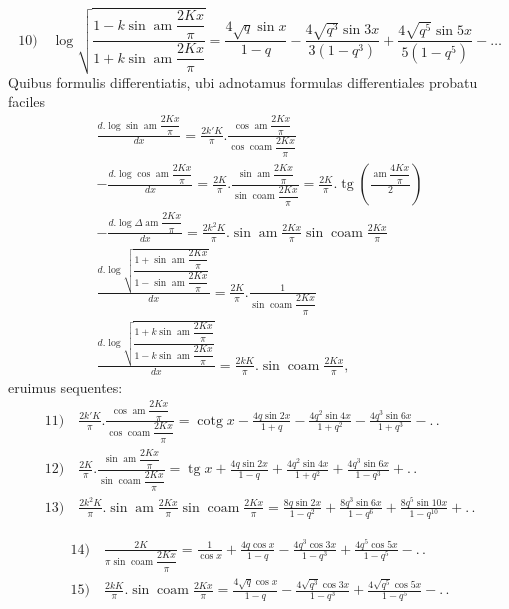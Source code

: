 \documentclass{article}
\begin{document}
\[
\text{10)}\quad\log\sqrt{\frac{1-k\sin\operatorname{am}\dfrac{2Kx}{\pi}}{1+k\sin\operatorname{am}\dfrac{2Kx}{\pi}}}=\frac{4\sqrt{q}\sin x}{1-q}-\frac{4\sqrt{q^{3}}\sin3x}{3(1-q^{3})}+\frac{4\sqrt{q^{5}}\sin5x}{5(1-q^{5})}-\ldots
\]
Quibus formulis differentiatis, ubi adnotamus formulas differentiales probatu faciles
\[
\begin{gathered}
\frac{d.\log\sin\operatorname{am}\dfrac{2Kx}{\pi}}{dx}=\frac{2k'K}{\pi}.\frac{\cos\operatorname{am}\dfrac{2Kx}{\pi}}{\cos\operatorname{coam}\dfrac{2Kx}{\pi}}\\[2ex]
-\frac{d.\log\cos\operatorname{am}\dfrac{2Kx}{\pi}}{dx}=\frac{2K}{\pi}.\frac{\sin\operatorname{am}\dfrac{2Kx}{\pi}}{\sin\operatorname{coam}\dfrac{2Kx}{\pi}}=\frac{2K}{\pi}.\operatorname{tg}\left(\frac{\operatorname{am}\dfrac{4Kx}{\pi}}{2}\right)\\[2ex]
-\frac{d.\log\Delta\operatorname{am}\dfrac{2Kx}{\pi}}{dx}=\frac{2k^{2}K}{\pi}.\sin\operatorname{am}\frac{2Kx}{\pi}\sin\operatorname{coam}\frac{2Kx}{\pi}\\[2ex]
\frac{d.\log\sqrt{\dfrac{1+\sin\operatorname{am}\dfrac{2Kx}{\pi}}{1-\sin\operatorname{am}\dfrac{2Kx}{\pi}}}}{dx}=\frac{2K}{\pi}.\frac{1}{\sin\operatorname{coam}\dfrac{2Kx}{\pi}}\\[2ex]
\frac{d.\log\sqrt{\dfrac{1+k\sin\operatorname{am}\dfrac{2Kx}{\pi}}{1-k\sin\operatorname{am}\dfrac{2Kx}{\pi}}}}{dx}=\frac{2kK}{\pi}.\sin\operatorname{coam}\frac{2Kx}{\pi},
\end{gathered}
\]
eruimus sequentes:
\[
\begin{gathered}
\text{11)}\quad\frac{2k'K}{\pi}.\frac{\cos\operatorname{am}\dfrac{2Kx}{\pi}}{\cos\operatorname{coam}\dfrac{2Kx}{\pi}}=\operatorname{cotg}x-\frac{4q\sin2x}{1+q}-\frac{4q^{2}\sin4x}{1+q^{2}}-\frac{4q^{3}\sin6x}{1+q^{3}}-.\,.\\[2ex]
\text{12)}\quad\frac{2K}{\pi}.\frac{\sin\operatorname{am}\dfrac{2Kx}{\pi}}{\sin\operatorname{coam}\dfrac{2Kx}{\pi}}=\operatorname{tg}x+\frac{4q\sin2x}{1-q}+\frac{4q^{2}\sin4x}{1+q^{2}}+\frac{4q^{3}\sin6x}{1-q^{3}}+.\,.\\[2ex]
\text{13)}\quad\frac{2k^{2}K}{\pi}.\sin\operatorname{am}\frac{2Kx}{\pi}\sin\operatorname{coam}\frac{2Kx}{\pi}=\frac{8q\sin2x}{1-q^{2}}+\frac{8q^{3}\sin6x}{1-q^{6}}+\frac{8q^{5}\sin10x}{1-q^{10}}+.\,.
\end{gathered}
\]

\[
\begin{gathered}
\text{14)}\quad\frac{2K}{\pi\sin\operatorname{coam}\dfrac{2Kx}{\pi}}=\frac{1}{\cos x}+\frac{4q\cos x}{1-q}-\frac{4q^{3}\cos3x}{1-q^{3}}+\frac{4q^{5}\cos5x}{1-q^{5}}-.\,.\\[2ex]
\text{15)}\quad\frac{2kK}{\pi}.\sin\operatorname{coam}\frac{2Kx}{\pi}=\frac{4\sqrt{q}\cos x}{1-q}-\frac{4\sqrt{q^{3}}\cos3x}{1-q^{3}}+\frac{4\sqrt{q^{5}}\cos5x}{1-q^{5}}-.\,.
\end{gathered}
\]
\end{document}
